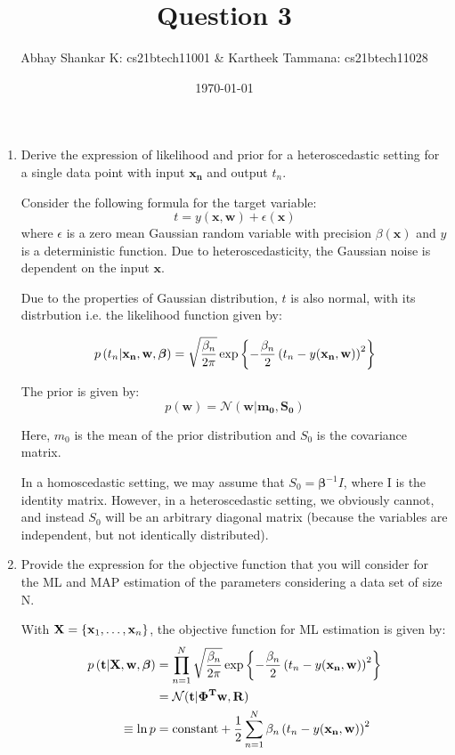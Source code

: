 \documentclass[reqno]{amsart}
\begin{document}
    \title{Question 3}
    \author{Abhay Shankar K: cs21btech11001 \& Kartheek Tammana: cs21btech11028}
    \date{\today}
    \maketitle

    \begin{enumerate}[label=\textbf{(\Roman*)}]
        \item Derive the expression of likelihood and prior for a heteroscedastic setting for a single data point with input \(\mathbf{x_n}\) and output \(t_n\).
        
        Consider the following formula for the target variable:
        \[t = y(\mathbf{x, w}) + \epsilon(\mathbf{x})\] where \(\epsilon\) is a zero mean Gaussian random variable with precision \(\beta(\mathbf{x})\) and \(y\) is a deterministic function. 
        Due to heteroscedasticity, the Gaussian noise is dependent on the input \(\mathbf{x}\). 
        
        Due to the properties of Gaussian distribution, \(t\) is also normal, with its distrbution i.e. the likelihood function given by:

        \[p\left(t_n | \mathbf{x_n}, \mathbf{w}, \boldsymbol{\beta}\right) = \sqrt{\frac{\beta_n}{2\pi}} \exp \left\{- \frac{\beta_n}{2} \left(t_n - y( \mathbf{x_n, w})\right)^2\right\}\]


        The prior is given by:
        \[p(\mathbf{w}) = \mathcal{N}(\mathbf{w} | \mathbf{m_0}, \mathbf{S_0})\]

        Here, \(m_0\) is the mean of the prior distribution and \(S_0\) is the covariance matrix.

        In a homoscedastic setting, we may assume that \(S_0 = \mathbf{\beta}^{-1} I\), where I is the identity matrix. However, in a heteroscedastic setting, we obviously cannot, and instead \(S_0\) will be an arbitrary diagonal matrix (because the variables are independent, but not identically distributed).

        \item Provide the expression for the objective function that you will consider for the ML and MAP estimation of the parameters considering a data set of size N.
        
        With \(\mathbf{X} = \left\{\mathbf{x}_1, \ldots, \mathbf{x}_{n}\right\}\), the objective function for ML estimation is given by:
        \begin{align}
            p\left(\mathbf{t} \middle| \mathbf{X}, \mathbf{w}, \boldsymbol{\beta}\right) &= \prod_{n = 1}^{N} \sqrt{\frac{\beta_n}{2\pi}} \exp \left\{- \frac{\beta_n}{2} \left(t_n - y(\mathbf{x_n, w})\right)^2\right\} \\
            &= \mathcal{N} (\mathbf{t}|\mathbf{\Phi^Tw, R})\\
            \equiv \ln p &= \text{constant} + \frac{1}{2} \sum_{n = 1}^{N} \beta_n \left(t_n - y(\mathbf{x_n, w})\right)^2 \label{eq:ml}
        \end{align}


\end{enumerate}
\end{document}

